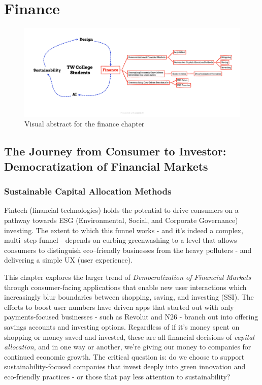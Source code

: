 \documentclass[
  letterpaper,
  DIV=11,
  numbers=noendperiod]{scrartcl}
\begin{document}
\newpage

\section{Finance}\label{finance}

\begin{figure}[H]

{\centering \includegraphics{./images/finance/abstract-finance.png}

}

\caption{Visual abstract for the finance chapter}

\end{figure}%

\subsection{The Journey from Consumer to Investor: Democratization of
Financial
Markets}\label{the-journey-from-consumer-to-investor-democratization-of-financial-markets}

\subsubsection{Sustainable Capital Allocation
Methods}\label{sustainable-capital-allocation-methods}

Fintech (financial technologies) holds the potential to drive consumers
on a pathway towards ESG (Environmental, Social, and Corporate
Governance) investing. The extent to which this funnel works - and it's
indeed a complex, multi--step funnel - depends on curbing greenwashing
to a level that allows consumers to distinguish eco--friendly businesses
from the heavy polluters - and delivering a simple UX (user experience).

This chapter explores the larger trend of \emph{Democratization of
Financial Markets} through consumer-facing applications that enable new
user interactions which increasingly blur boundaries between shopping,
saving, and investing (SSI). The efforts to boost user numbers have
driven apps that started out with only payments-focused businesses -
such as Revolut and N26 - branch out into offering savings accounts and
investing options. Regardless of if it's money spent on shopping or
money saved and invested, these are all financial decisions of
\emph{capital allocation}, and in one way or another, we're giving our
money to companies for continued economic growth. The critical question
is: do we choose to support sustainability-focused companies that invest
deeply into green innovation and eco-friendly practices - or those that
pay less attention to sustainability?
\end{document}
